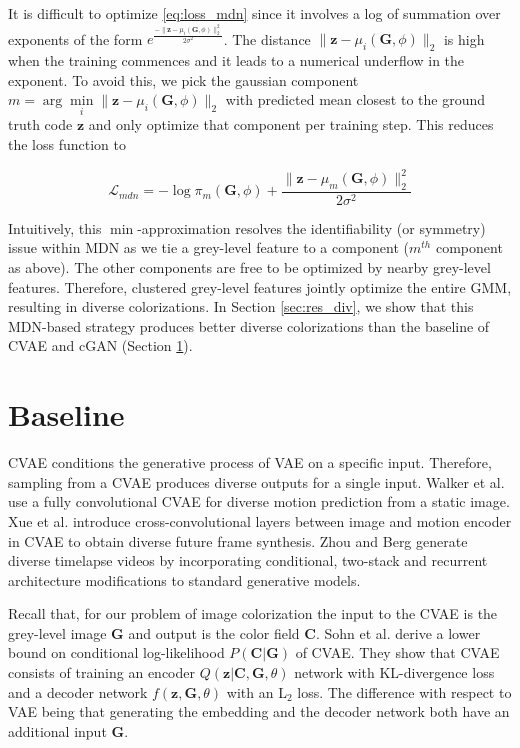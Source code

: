 \documentclass[10pt,twocolumn,letterpaper]{article}
\begin{document}
It is difficult to optimize \autoref{eq:loss_mdn} since it involves a log of 
summation over exponents of the form 
$e^{\frac{-\|\mathbf{z}-\mu_i(\mathbf{G}, \phi)\|^{2}_{2}}{2\sigma^{2}}}$. The
distance $\| \mathbf{z} - \mu_i(\mathbf{G}, \phi) \|_{2}$ is high when the 
training commences and it leads to a numerical underflow in the exponent.
To avoid this, we pick the gaussian component $m = \arg\min\limits_{i} 
\| \mathbf{z} - \mu_i(\mathbf{G}, \phi) \|_{2}$ with predicted mean closest
to the ground truth code $\mathbf{z}$ and only optimize that component per 
training step. This reduces the loss function to

\begin{equation}
\label{eq:loss_mdn}
\mathcal{L}_{mdn} = - \log \pi_{m}(\mathbf{G}, \phi) + \frac{\|\mathbf{z}-\mu_m(\mathbf{G}, \phi)\|^{2}_{2}}{2\sigma^{2}}
\end{equation}

Intuitively, this $\min$-approximation resolves the identifiability (or symmetry) issue within 
MDN as we tie a grey-level feature to a component ($m^{th}$ component as above). The other components are
free to be optimized by nearby grey-level features. Therefore, clustered
grey-level features jointly optimize the entire GMM, resulting in diverse 
colorizations. In Section \ref{sec:res_div}, we show that this MDN-based strategy 
produces better diverse colorizations than the baseline of CVAE and cGAN
(Section \ref{sec:baseline}). 

\section{Baseline}\label{sec:baseline} CVAE 
conditions the generative process of VAE on a specific input. 
Therefore, sampling from a CVAE produces diverse outputs for a single 
input. Walker et al. \cite{Walker} use a fully convolutional CVAE for 
diverse motion prediction from a static image. Xue et 
al. \cite{CrossConv} introduce cross-convolutional layers between 
image and motion encoder in CVAE to obtain diverse future frame
synthesis. Zhou and Berg \cite{TLBerg} generate diverse timelapse
videos by incorporating conditional, two-stack and 
recurrent architecture modifications to standard generative models.

Recall that, for our problem of image colorization the input to the CVAE is the 
grey-level image $\mathbf{G}$ and output is the color field $\mathbf{C}$. 
Sohn et al. \cite{Sohn} derive a lower bound on conditional 
log-likelihood $P(\mathbf{C}|\mathbf{G})$ of CVAE. They show that 
CVAE consists of training an encoder $Q(\mathbf{z}|\mathbf{C},\mathbf{G}, \theta)$ 
network with KL-divergence loss and a decoder network $f(\mathbf{z}, \mathbf{G}, \theta)$ with 
an L$_2$ loss. The difference with respect to VAE being that generating the 
embedding and the decoder network both have an additional input $\mathbf{G}$. \\ 
\end{document}
